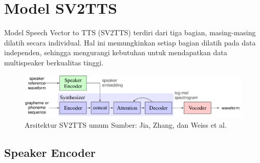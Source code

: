 \section{Model SV2TTS}
Model Speech Vector to TTS (SV2TTS) terdiri dari tiga bagian, masing-masing dilatih secara individual.
Hal ini memungkinkan setiap bagian dilatih pada data independen, sehingga mengurangi kebutuhan untuk mendapatkan data multispeaker berkualitas tinggi.

\begin{figure}[H]
        \centerline{\includegraphics[scale=.35]{figures/arsitektur}}
        \caption{Arsitektur SV2TTS umum Sumber: Jia, Zhang, dan Weiss et al.}
		\label{arsitektur}
\end{figure}

\subsection{Speaker Encoder}

